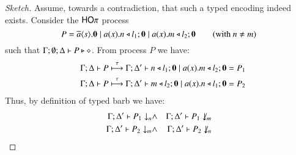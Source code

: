 \begin{proof}[Sketch]
Assume, towards a contradiction, that such a typed encoding indeed exists. 
Consider the $\mathsf{HO}\pi$ process
$$
P = \overline{a} \langle s \rangle . \mathbf{0} \;|\; a (x) . n \triangleleft l_1 ; \mathbf{0} \;|\; a (x) . m \triangleleft l_2 ; \mathbf{0} \qquad \text{(with $n \neq m$)}
$$
such that 
$\Gamma; \emptyset; \Delta \vdash P \triangleright \diamond$.
From process $P$ we have: %
\begin{eqnarray}
& & \Gamma; \Delta \vdash P \stackrel{\tau}{\longmapsto} \Gamma; \Delta' \vdash n \triangleleft l_1 ; \mathbf{0} \;|\; a (x) . m \triangleleft l_2 ; \mathbf{0} = P_1  \label{eq:nn3} \\
& & \Gamma; \Delta \vdash P \stackrel{\tau}{\longmapsto} \Gamma; \Delta' \vdash m \triangleleft l_2 ; \mathbf{0} \;|\; a (x) . n \triangleleft l_1 ; \mathbf{0} = P_2  \label{eq:nn4}
\end{eqnarray}
Thus, by definition of typed barb we  have:
\begin{eqnarray}
\Gamma; \Delta' \vdash P_1 \downarrow_{n} & \land & 
\Gamma; \Delta' \vdash P_1 \not\downarrow_{m} \label{eq:nn1} \\
\Gamma; \Delta' \vdash P_2 \downarrow_{m} & \land & 
\Gamma; \Delta' \vdash P_2 \not\downarrow_{n} \label{eq:nn2}
\end{eqnarray}


\end{proof}
